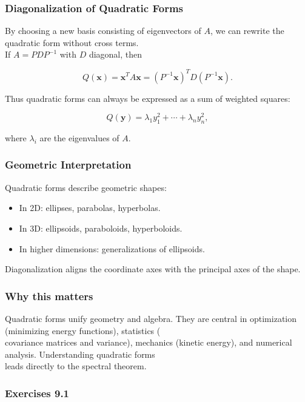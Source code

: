 \documentclass[
  12pt,
  a4paper,
]{article}
\begin{document}
\subsubsection{Diagonalization of Quadratic
Forms}\label{diagonalization-of-quadratic-forms}

By choosing a new basis consisting of eigenvectors of \(A\), we can
rewrite the quadratic form without cross terms.\\
If \(A = PDP^{-1}\) with \(D\) diagonal, then

\[Q(\mathbf{x}) = \mathbf{x}^T A \mathbf{x} = (P^{-1}\mathbf{x})^T D (P^{-1}\mathbf{x}).\]

Thus quadratic forms can always be expressed as a sum of weighted
squares:

\[Q(\mathbf{y}) = \lambda_1 y_1^2 + \cdots + \lambda_n y_n^2,\]

where \(\lambda_i\) are the eigenvalues of \(A\).

\subsubsection{Geometric
Interpretation}\label{geometric-interpretation-20}

Quadratic forms describe geometric shapes:

\begin{itemize}
\item
  In 2D: ellipses, parabolas, hyperbolas.
\item
  In 3D: ellipsoids, paraboloids, hyperboloids.
\item
  In higher dimensions: generalizations of ellipsoids.
\end{itemize}

Diagonalization aligns the coordinate axes with the principal axes of
the shape.

\subsubsection{Why this matters}\label{why-this-matters-32}

Quadratic forms unify geometry and algebra. They are central in
optimization (minimizing energy functions), statistics (\\
covariance matrices and variance), mechanics (kinetic energy), and
numerical analysis. Understanding quadratic forms\\
leads directly to the spectral theorem.

\subsubsection{Exercises 9.1}\label{exercises-91}
\end{document}
